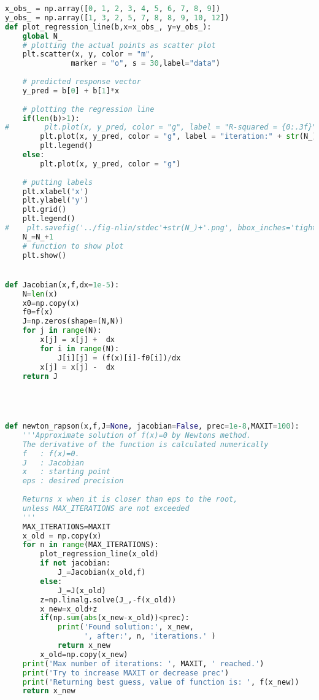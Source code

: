 \documentclass[graybox,sectrefs,envcountresetchap,open=right,final]{svmonodo}
\newenvironment{doconceexercise}{}{}
\begin{document}
\begin{doconceexercise}
\begin{lstlisting}[language=python,style=blue1]
x_obs_ = np.array([0, 1, 2, 3, 4, 5, 6, 7, 8, 9]) 
y_obs_ = np.array([1, 3, 2, 5, 7, 8, 8, 9, 10, 12]) 
def plot_regression_line(b,x=x_obs_, y=y_obs_): 
    global N_
    # plotting the actual points as scatter plot 
    plt.scatter(x, y, color = "m", 
               marker = "o", s = 30,label="data") 
  
    # predicted response vector 
    y_pred = b[0] + b[1]*x
  
    # plotting the regression line
    if(len(b)>1):
#        plt.plot(x, y_pred, color = "g", label = "R-squared = {0:.3f}".format(b[2]))
        plt.plot(x, y_pred, color = "g", label = "iteration:" + str(N_) +", (b[0],b[1])= ({0:.3f}".format(b[0]) + ", {0:.3f})".format(b[1]))
        plt.legend()
    else:
        plt.plot(x, y_pred, color = "g")
  
    # putting labels 
    plt.xlabel('x') 
    plt.ylabel('y') 
    plt.grid()
    plt.legend()
#    plt.savefig('../fig-nlin/stdec'+str(N_)+'.png', bbox_inches='tight',transparent=True)
    N_=N_+1  
    # function to show plot 
    plt.show() 


def Jacobian(x,f,dx=1e-5):
    N=len(x)
    x0=np.copy(x)
    f0=f(x)
    J=np.zeros(shape=(N,N))
    for j in range(N):
        x[j] = x[j] +  dx
        for i in range(N):   
            J[i][j] = (f(x)[i]-f0[i])/dx
        x[j] = x[j] -  dx
    return J




def newton_rapson(x,f,J=None, jacobian=False, prec=1e-8,MAXIT=100):
    '''Approximate solution of f(x)=0 by Newtons method.
    The derivative of the function is calculated numerically
    f   : f(x)=0.
    J   : Jacobian
    x   : starting point  
    eps : desired precision
    
    Returns x when it is closer than eps to the root, 
    unless MAX_ITERATIONS are not exceeded
    '''
    MAX_ITERATIONS=MAXIT
    x_old = np.copy(x)
    for n in range(MAX_ITERATIONS):
        plot_regression_line(x_old) 
        if not jacobian:
            J_=Jacobian(x_old,f)
        else:
            J_=J(x_old)
        z=np.linalg.solve(J_,-f(x_old))
        x_new=x_old+z
        if(np.sum(abs(x_new-x_old))<prec):
            print('Found solution:', x_new, 
                  ', after:', n, 'iterations.' )
            return x_new
        x_old=np.copy(x_new)
    print('Max number of iterations: ', MAXIT, ' reached.') 
    print('Try to increase MAXIT or decrease prec')
    print('Returning best guess, value of function is: ', f(x_new))
    return x_new



\end{lstlisting}
\end{doconceexercise}
\end{document}
